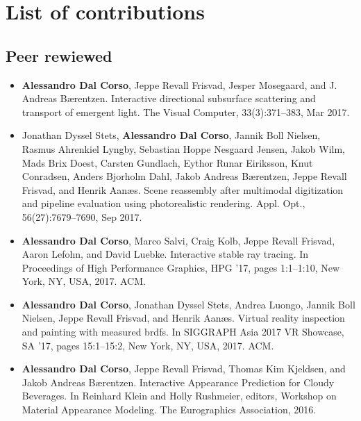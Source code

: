 \chapter*{List of contributions}
\label{sec:contributionlist}
\section*{Peer rewiewed}
\begin{itemize}
\item \textbf{Alessandro Dal Corso}, Jeppe Revall Frisvad, Jesper Mosegaard, and J. Andreas Bærentzen. Interactive directional subsurface scattering and transport of emergent light. The Visual Computer, 33(3):371–383, Mar 2017.~\cite{dalcorso17dirsss}
\item Jonathan Dyssel Stets, \textbf{Alessandro Dal Corso}, Jannik Boll Nielsen, Rasmus Ahrenkiel Lyngby, Sebastian Hoppe Nesgaard Jensen, Jakob Wilm, Mads Brix Doest, Carsten Gundlach, Eythor Runar Eiriksson, Knut Conradsen, Anders Bjorholm Dahl, Jakob Andreas Bærentzen, Jeppe Revall Frisvad, and Henrik Aanæs. Scene reassembly after multimodal digitization and pipeline evaluation using photorealistic rendering. Appl. Opt., 56(27):7679–7690, Sep 2017.~\cite{stets17}
\item \textbf{Alessandro Dal Corso}, Marco Salvi, Craig Kolb, Jeppe Revall Frisvad, Aaron Lefohn, and David Luebke. Interactive stable ray tracing. In Proceedings of High Performance Graphics, HPG ’17, pages 1:1–1:10, New York, NY, USA, 2017. ACM. \cite{dalcorso17hpg}
\item \textbf{Alessandro Dal Corso}, Jonathan Dyssel Stets, Andrea Luongo, Jannik Boll Nielsen, Jeppe Revall Frisvad, and Henrik Aanæs. Virtual reality inspection and painting with measured brdfs. In SIGGRAPH Asia 2017 VR Showcase, SA ’17, pages 15:1–15:2, New York, NY, USA, 2017. ACM.~\cite{dalcorso17vr}
\item \textbf{Alessandro Dal Corso}, Jeppe Revall Frisvad, Thomas Kim Kjeldsen, and Jakob Andreas Bærentzen. Interactive Appearance Prediction for Cloudy Beverages. In Reinhard Klein and Holly Rushmeier, editors, Workshop on Material Appearance Modeling. The Eurographics Association, 2016.~\cite{dalcorsomam16}
\end{itemize}

